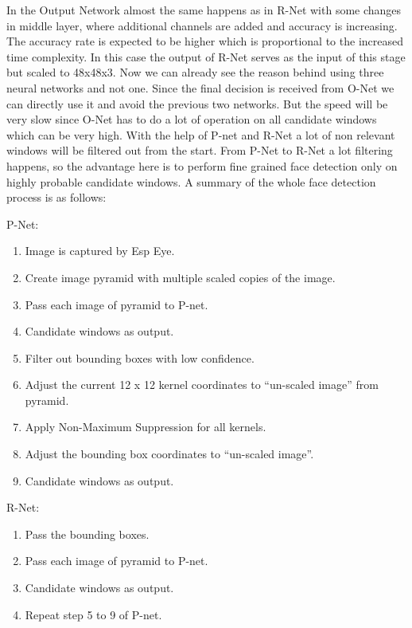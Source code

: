 In the Output Network almost the same happens as in R-Net with some changes in middle layer, where additional channels are added and accuracy is increasing. The accuracy rate is expected to be higher which is proportional to the increased time complexity. In this case the output of R-Net serves as the input of this stage but scaled to 48x48x3. 
Now we can already see the reason behind using three neural networks and not one. Since the final decision is received from O-Net we can directly use it and avoid the previous two networks. But the speed will be very slow since O-Net has to do a lot of operation on all candidate windows which can be very high. With the help of P-net and R-Net a lot of non relevant windows will be filtered out from the start. From P-Net to R-Net a lot filtering happens, so the advantage here is to perform fine grained face detection only on highly probable candidate windows. A summary of the whole face detection process is as follows: 
 
 P-Net:
\begin{enumerate}
  \vspace{-0.7cm} \item Image is captured by Esp Eye.
  \vspace{-0.3cm}\item Create image pyramid with multiple scaled copies of the image.
  \vspace{-0.3cm} \item Pass each image of pyramid to P-net.
  \vspace{-0.3cm} \item Candidate windows as output.
  \vspace{-0.3cm} \item Filter out bounding boxes with low confidence.
  \vspace{-0.3cm} \item Adjust the current 12 x 12 kernel coordinates to “un-scaled image” from pyramid.
  \vspace{-0.3cm} \item Apply Non-Maximum Suppression for all kernels.
   \vspace{-0.3cm} \item Adjust the bounding box coordinates to “un-scaled image”.
   \vspace{-0.3cm} \item Candidate windows as output.
\end{enumerate}

 R-Net:
\begin{enumerate}
  \vspace{-0.7cm} \item Pass the bounding boxes.
   \vspace{-0.3cm} \item Pass each image of pyramid to P-net.
  \vspace{-0.3cm} \item Candidate windows as output.
  \vspace{-0.3cm} \item Repeat step 5 to 9 of P-net.
\end{enumerate}


